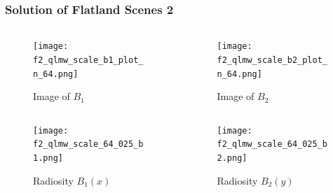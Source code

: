 \begin{frame}\frametitle{Solution of Flatland Scenes 2}
    \vspace{-7 mm}
      \begin{columns}[T]
          \begin{column}{.4\textwidth}
      
              \begin{figure}
              \centering
              \texttt{[image: f2\_qlmw\_scale\_b1\_plot\_n\_64.png]}
              \caption{Image of $B_1$}
              \label{fig_gen_kernel_2D}
              \end{figure}
        \end{column}

        \begin{column}{.5\textwidth}

                \begin{figure}
              \centering
              \texttt{[image: f2\_qlmw\_scale\_b2\_plot\_n\_64.png]}
              \caption{Image of $B_2$}
              \label{fig_gen_kernel_2D}
              \end{figure}
        \end{column}
      \end{columns}
        \begin{columns}[T]
          \begin{column}{.5\textwidth}
      
              \begin{figure}
              \centering
              \texttt{[image: f2\_qlmw\_scale\_64\_025\_b1.png]}
              \caption{Radiosity $B_1(x)$}
              \label{fig_gen_kernel_2D}
              \end{figure}
        \end{column}

        \begin{column}{.5\textwidth}
              \begin{figure}
              \centering
              \texttt{[image: f2\_qlmw\_scale\_64\_025\_b2.png]}
              \caption{Radiosity $B_2(y)$}
              \label{fig_gen_kernel_2D}
              \end{figure}
        \end{column}
      \end{columns}
    \end{frame}



